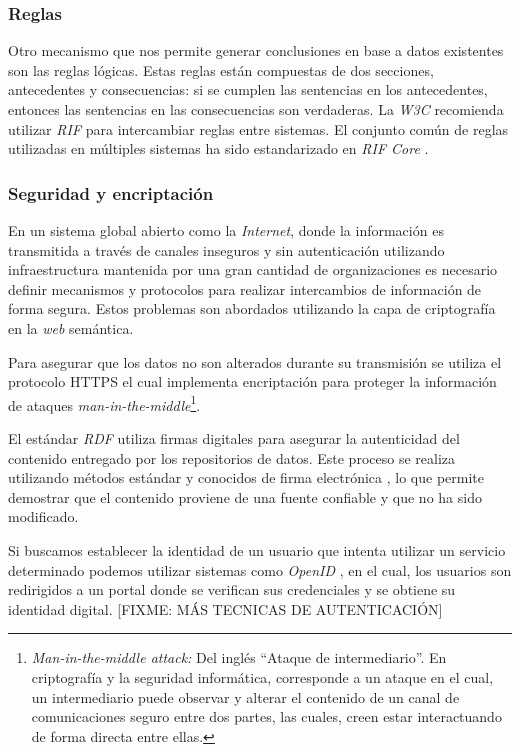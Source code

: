\subsubsection{Reglas}

Otro mecanismo que nos permite generar conclusiones en base a datos existentes
son las reglas lógicas. Estas reglas están compuestas de dos secciones,
antecedentes y consecuencias: si se cumplen las sentencias en los antecedentes,
entonces las sentencias en las consecuencias son verdaderas. La \textit{W3C}
recomienda utilizar \textit{RIF} \cite{kifer2013rif} para intercambiar reglas
entre sistemas. El conjunto común de reglas utilizadas en múltiples sistemas ha
sido estandarizado en \textit{RIF Core} \cite{boley2010rif}.

\subsubsection{Seguridad y encriptación}

En un sistema global abierto como la \textit{Internet}, donde la información es
transmitida a través de canales inseguros y sin autenticación utilizando
infraestructura mantenida por una gran cantidad de organizaciones es necesario
definir mecanismos y protocolos para realizar intercambios de información de
forma segura. Estos problemas son abordados utilizando la capa de criptografía
en la \textit{web} semántica.

Para asegurar que los datos no son alterados durante su transmisión se utiliza
el protocolo HTTPS \cite{rescorla2000rfc2818} el cual implementa encriptación
para proteger la información de ataques
\textit{man-in-the-middle}\footnote{\textit{Man-in-the-middle attack:} Del
inglés ``Ataque de intermediario''. En criptografía y la seguridad informática,
corresponde a un ataque en el cual, un intermediario puede observar y alterar el
contenido de un canal de comunicaciones seguro entre dos partes, las cuales,
creen estar interactuando de forma directa entre ellas.}.

El estándar \textit{RDF} utiliza firmas digitales para asegurar la autenticidad
del contenido entregado por los repositorios de datos. Este proceso se realiza
utilizando métodos estándar y conocidos de firma electrónica
\cite{carroll2003signing}, lo que permite demostrar que el contenido proviene de
una fuente confiable y que no ha sido modificado.

Si buscamos establecer la identidad de un usuario que intenta utilizar un
servicio determinado podemos utilizar sistemas como \textit{OpenID}
\cite{recordon2006openid}, en el cual, los usuarios son redirigidos a un portal
donde se verifican sus credenciales y se obtiene su identidad digital. [FIXME:
MÁS TECNICAS DE AUTENTICACIÓN]

